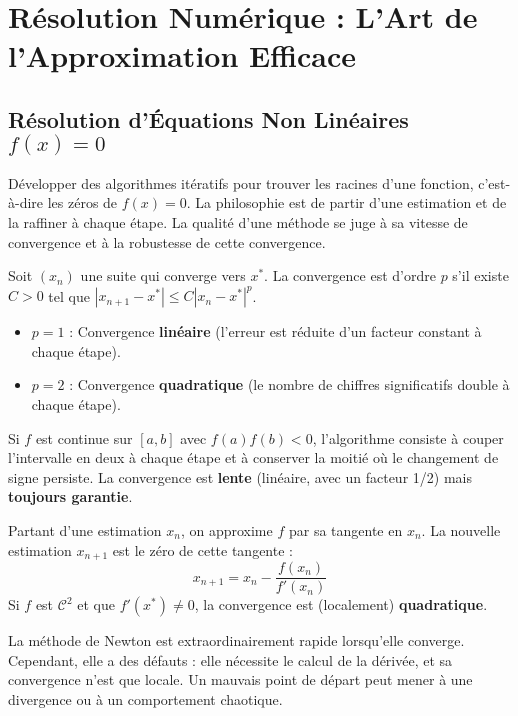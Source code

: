 \chapter{Résolution Numérique : L'Art de l'Approximation Efficace}

\section{Résolution d'Équations Non Linéaires $f(x)=0$}

\begin{objectif}
    Développer des algorithmes itératifs pour trouver les racines d'une fonction, c'est-à-dire les zéros de $f(x)=0$. La philosophie est de partir d'une estimation et de la raffiner à chaque étape. La qualité d'une méthode se juge à sa vitesse de convergence et à la robustesse de cette convergence.
\end{objectif}

\begin{definition}
    Soit $(x_n)$ une suite qui converge vers $x^*$. La convergence est d'ordre $p$ s'il existe $C>0$ tel que $|x_{n+1}-x^*| \le C |x_n - x^*|^p$.
    \begin{itemize}
        \item $p=1$ : Convergence \textbf{linéaire} (l'erreur est réduite d'un facteur constant à chaque étape).
        \item $p=2$ : Convergence \textbf{quadratique} (le nombre de chiffres significatifs double à chaque étape).
    \end{itemize}
\end{definition}

\begin{proposition}
    Si $f$ est continue sur $[a,b]$ avec $f(a)f(b)<0$, l'algorithme consiste à couper l'intervalle en deux à chaque étape et à conserver la moitié où le changement de signe persiste.
    La convergence est \textbf{lente} (linéaire, avec un facteur 1/2) mais \textbf{toujours garantie}.
\end{proposition}

\begin{theorem}
    Partant d'une estimation $x_n$, on approxime $f$ par sa tangente en $x_n$. La nouvelle estimation $x_{n+1}$ est le zéro de cette tangente :
    $$ x_{n+1} = x_n - \frac{f(x_n)}{f'(x_n)} $$
    Si $f$ est $\mathcal{C}^2$ et que $f'(x^*) \neq 0$, la convergence est (localement) \textbf{quadratique}.
\end{theorem}
\begin{remark}
    La méthode de Newton est extraordinairement rapide lorsqu'elle converge. Cependant, elle a des défauts : elle nécessite le calcul de la dérivée, et sa convergence n'est que locale. Un mauvais point de départ peut mener à une divergence ou à un comportement chaotique.
\end{remark}

